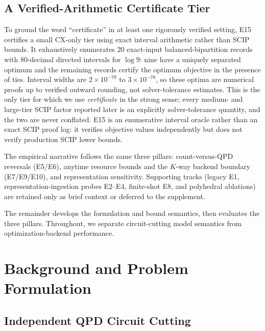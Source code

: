 \documentclass[11pt]{article}
\begin{document}
\subsection{A Verified-Arithmetic Certificate Tier}

To ground the word ``certificate'' in at least one rigorously verified setting, E15 certifies a small CX-only tier using exact interval arithmetic rather than SCIP bounds. It exhaustively enumerates 20 exact-input balanced-bipartition records with 80-decimal directed intervals for $\log 9$: nine have a uniquely separated optimum and the remaining records certify the optimum objective in the presence of ties. Interval widths are $2\times10^{-79}$ to $3\times10^{-78}$, so these optima are numerical proofs up to verified outward rounding, not solver-tolerance estimates. This is the only tier for which we use \emph{certificate} in the strong sense; every medium- and large-tier SCIP factor reported later is an explicitly solver-tolerance quantity, and the two are never conflated. E15 is an enumerative interval oracle rather than an exact SCIP proof log: it verifies objective values independently but does not verify production SCIP lower bounds.

The empirical narrative follows the same three pillars: count-versus-QPD reversals (E5/E6), anytime resource bounds and the $K$-way backend boundary (E7/E9/E10), and representation sensitivity. Supporting tracks (legacy E1, representation-ingestion probes E2--E4, finite-shot E8, and polyhedral ablations) are retained only as brief context or deferred to the supplement.

The remainder develops the formulation and bound semantics, then evaluates the three pillars. Throughout, we separate circuit-cutting model semantics from optimization-backend performance.

\section{Background and Problem Formulation}

\subsection{Independent QPD Circuit Cutting}
\end{document}
